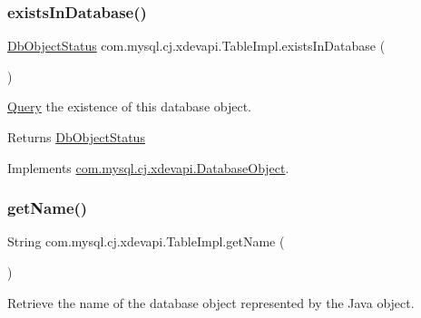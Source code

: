 \mbox{\label{classcom_1_1mysql_1_1cj_1_1xdevapi_1_1_table_impl_aa51ee706e090fe9acd2e81c313e5a6eb}} 
\subsubsection{\texorpdfstring{exists\+In\+Database()}{existsInDatabase()}}
{\footnotesize\ttfamily \mbox{\hyperlink{enumcom_1_1mysql_1_1cj_1_1xdevapi_1_1_database_object_1_1_db_object_status}{Db\+Object\+Status}} com.\+mysql.\+cj.\+xdevapi.\+Table\+Impl.\+exists\+In\+Database (\begin{DoxyParamCaption}{ }\end{DoxyParamCaption})}

\mbox{\hyperlink{interfacecom_1_1mysql_1_1cj_1_1_query}{Query}} the existence of this database object.

\begin{DoxyReturn}{Returns}
\mbox{\hyperlink{}{Db\+Object\+Status}} 
\end{DoxyReturn}


Implements \mbox{\hyperlink{interfacecom_1_1mysql_1_1cj_1_1xdevapi_1_1_database_object_ab4215a82b546a9e1dcb344c339765d7a}{com.\+mysql.\+cj.\+xdevapi.\+Database\+Object}}.

\mbox{\label{classcom_1_1mysql_1_1cj_1_1xdevapi_1_1_table_impl_aeef36a88f386e5a6a7375315ab2af2c8}} 
\subsubsection{\texorpdfstring{get\+Name()}{getName()}}
{\footnotesize\ttfamily String com.\+mysql.\+cj.\+xdevapi.\+Table\+Impl.\+get\+Name (\begin{DoxyParamCaption}{ }\end{DoxyParamCaption})}

Retrieve the name of the database object represented by the Java object.


